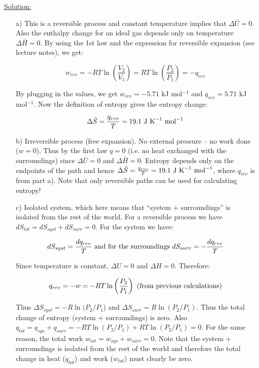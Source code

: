 \noindent
\underline{Solution:}\\

\begin{itemize}

\item[a)] This is a reversible process and constant temperature implies that $\Delta\bar{U} = 0$. Also the enthalpy change for an ideal gas depends only on temperature $\Delta\bar{H} = 0$. By using the 1st law and the expression for reversible expansion (see lecture notes), we get:

$$w_{rev} = -RT\ln\left(\frac{V_2}{V_1}\right) = RT\ln\left(\frac{P_2}{P_1}\right) = - q_{rev}$$

By plugging in the values, we get $w_{rev} = -5.71$ kJ mol$^{-1}$ and $q_{rev} = 5.71$ kJ mol$^{-1}$. Now the definition of entropy gives the entropy change:

$$\Delta\bar{S} = \frac{q_{rev}}{T} = 19.1\textnormal{ J K}^{-1}\textnormal{ mol}^{-1}$$

\item[b)] Irreversible process (free expansion). No external pressure -- no work done ($w = 0$). Thus by the first law $q = 0$ (i.e. no heat exchanged with the surroundings) since $\Delta\bar{U} = 0$ and $\Delta\bar{H} = 0$. Entropy depends only on the endpoints of the path and hence $\Delta\bar{S} = \frac{q_{rev}}{T} = 19.1\textnormal{ J K}^{-1}\textnormal{ mol}^{-1}$, where $q_{rev}$ is from part a). Note that only reversible paths can be used for calculating entropy!

\item[c)] Isolated system, which here means that ``system + surroundings'' is isolated from the rest of the world. For a reversible process we have $dS_{tot} = dS_{syst} + dS_{surr} = 0$. For the system we have:

$$dS_{syst} = \frac{dq_{rev}}{T}\textnormal{ and for the surroundings }dS_{surr} = -\frac{dq_{rev}}{T}$$

Since temperature is constant, $\Delta U = 0$ and $\Delta H = 0$. Therefore:

$$q_{rev} = -w = -RT\ln\left(\frac{P_2}{P_1}\right)\textnormal{ (from previous calculations)}$$

Thus $\Delta S_{syst} = -R\ln(P_2/P_1$) and $\Delta S_{surr}  = R\ln(P_2/P_1)$. Thus the total change of entropy (system + surroundings) is zero. Also $q_{tot} = q_{sys} + q_{surr} = -RT\ln(P_2/P_1) + RT\ln(P_2/P_1) = 0$. For the same reason, the total work $w_{tot} = w_{sys} + w_{surr} = 0$. Note that the system + surroundings is isolated from the rest of the world and therefore the total change in heat ($q_{tot}$) and work ($w_{tot}$) must clearly be zero.


\end{itemize}
